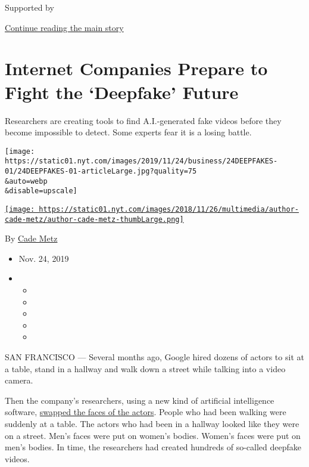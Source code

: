 Supported by

\protect\hyperlink{after-sponsor}{Continue reading the main story}

\hypertarget{internet-companies-prepare-to-fight-the-deepfake-future}{%
\section{Internet Companies Prepare to Fight the `Deepfake'
Future}\label{internet-companies-prepare-to-fight-the-deepfake-future}}

Researchers are creating tools to find A.I.-generated fake videos before
they become impossible to detect. Some experts fear it is a losing
battle.

\texttt{[image: https://static01.nyt.com/images/2019/11/24/business/24DEEPFAKES-01/24DEEPFAKES-01-articleLarge.jpg?quality=75\\\&auto=webp\\\&disable=upscale]}

\href{https://www.nytimes.com/by/cade-metz}{\texttt{[image: https://static01.nyt.com/images/2018/11/26/multimedia/author-cade-metz/author-cade-metz-thumbLarge.png]}}

By \href{https://www.nytimes.com/by/cade-metz}{Cade Metz}

\begin{itemize}
\item
  Nov. 24, 2019
\item
  \begin{itemize}
  \item
  \item
  \item
  \item
  \item
  \end{itemize}
\end{itemize}

SAN FRANCISCO --- Several months ago, Google hired dozens of actors to
sit at a table, stand in a hallway and walk down a street while talking
into a video camera.

Then the company's researchers, using a new kind of artificial
intelligence software,
\href{https://ai.googleblog.com/2019/09/contributing-data-to-deepfake-detection.html}{swapped
the faces of the actors}. People who had been walking were suddenly at a
table. The actors who had been in a hallway looked like they were on a
street. Men's faces were put on women's bodies. Women's faces were put
on men's bodies. In time, the researchers had created hundreds of
so-called deepfake videos.

